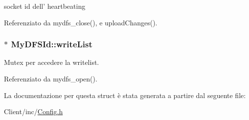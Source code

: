 socket id dell' heartbeating 



Referenziato da mydfs\+\_\+close(), e upload\+Changes().

\hypertarget{structMyDFSId_a0f7d2a9c60ddc649ee7e65b8b9295432}{
\subsubsection[{write\+List}]{$\ast$ My\+D\+F\+S\+Id\+::write\+List}}\label{structMyDFSId_a0f7d2a9c60ddc649ee7e65b8b9295432}


Mutex per accedere la writelist. 



Referenziato da mydfs\+\_\+open().



La documentazione per questa struct è stata generata a partire dal seguente file\+:\begin{DoxyCompactItemize}
\item 
Client/inc/\hyperlink{Client_2inc_2Config_8h}{Config.\+h}\end{DoxyCompactItemize}
